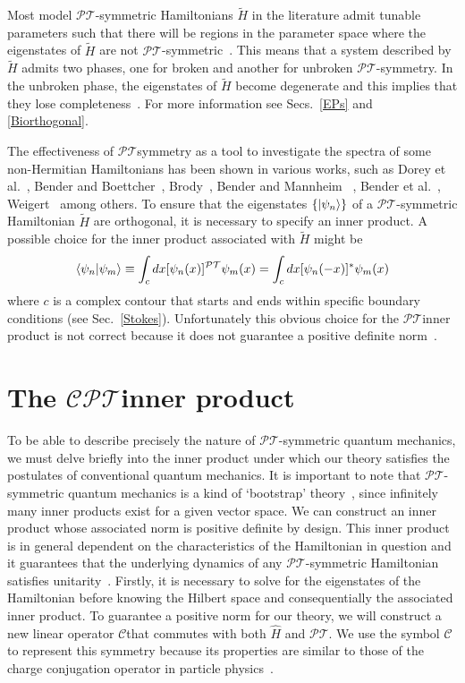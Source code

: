 \documentclass[12pt, a4paper]{report}
\newcommand\PT{\(\mathcal{PT}\)}
\newcommand\CC{\(\mathcal{C}\)}
\begin{document}
Most model \PT-symmetric Hamiltonians $\tilde{H}$ in the literature admit tunable parameters such that there will be regions in the parameter space where the eigenstates of $\tilde{H}$ are not \PT-symmetric~\cite{Brody_2013}. This means that a system described by $\tilde{H}$ admits two phases, one for broken and another for unbroken \PT-symmetry. In the unbroken phase, the eigenstates of $\tilde{H}$ become degenerate and this implies that they lose completeness~\cite{Brody_2013}. For more information see Secs.~\ref{EPs} and \ref{Biorthogonal}.

The effectiveness of \PT\:symmetry as a tool to investigate the spectra of some non-Hermitian Hamiltonians has been shown in various works, such as Dorey et al.~\cite{Dorey_2001, Dorey_2004}, Bender and Boettcher~\cite{RealSpectrainNHH}, Brody~\cite{Brody_2016}, Bender and Mannheim ~\cite{Bender_2010}, Bender et al.~\cite{PTsymmetricQM}, Weigert~\cite{Weigert_2003} among others.
To ensure that the eigenstates $\{\ket{\psi_n}\}$ of a \PT-symmetric Hamiltonian $\tilde{H}$ are orthogonal, it is necessary to specify an inner product. A possible choice for the inner product associated with $\tilde{H}$ might be~\cite{PTsymmetricQM}
\begin{equation}\label{eq:2.3}
\braket{\psi_n|\psi_m} \equiv \int_{c} dx [\psi_{n}(x)]^{\mathcal{PT}}\psi_m(x) = \int_{c} dx [\psi_{n}(-x)]^{*}\psi_m(x)
\end{equation}
where $c$ is a complex contour that starts and ends within specific boundary conditions (see Sec.~\ref{Stokes}). Unfortunately this obvious choice for the \PT\:inner product is not correct because it does not guarantee a positive definite norm~\cite{MakingSense}.

\section{The \texorpdfstring{$\mathcal{CPT}$}\:\:inner product}\label{CPT}
To be able to describe precisely the nature of \PT-symmetric quantum mechanics, we must delve briefly into the inner product under which our theory satisfies the postulates of conventional quantum mechanics. It is important to note that \PT-symmetric quantum mechanics is a kind of `bootstrap' theory~\cite{MakingSense}, since infinitely many inner products exist for a given vector space. We can construct an inner product whose associated norm is positive definite by design. This inner product is in general dependent on the characteristics of the Hamiltonian in question and it guarantees that the underlying dynamics of any \PT-symmetric Hamiltonian satisfies unitarity~\cite{MustaHbeHermitian}.
Firstly, it is necessary to solve for the eigenstates of the Hamiltonian before knowing the Hilbert space and consequentially the associated inner product.
To guarantee a positive norm for our theory, we will construct a new linear operator \CC\:that commutes with both $\hat{H}$ and \PT. We use the symbol \CC\: to represent this symmetry because its properties are similar to those of the charge conjugation operator in particle physics~\cite{MakingSense}.
\end{document}
